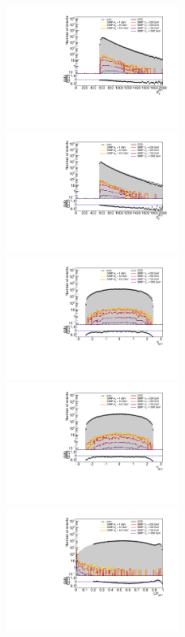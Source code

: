 \begin{figure}[ht]
  \centering
  \includegraphics[width=0.5\textwidth]{figures/jetpt1_neutrons}\hfill%
  \includegraphics[width=0.5\textwidth]{figures/jetpt2_neutrons}
  \includegraphics[width=0.5\textwidth]{figures/jet1eta_neutrons}\hfill%
  \includegraphics[width=0.5\textwidth]{figures/jet2eta_neutrons}
  \includegraphics[width=0.5\textwidth]{figures/jet1chf_neutrons}\hfill%

\end{figure}
